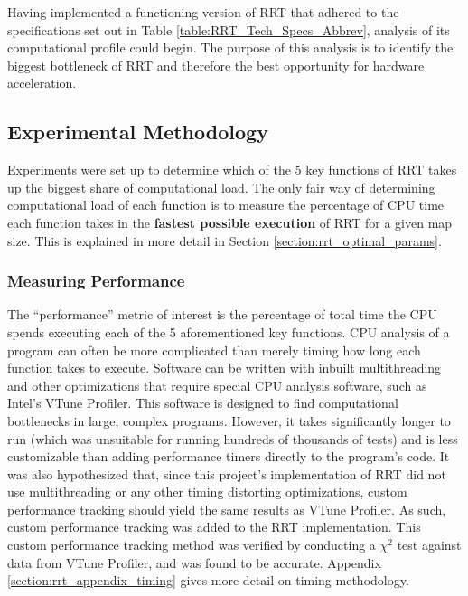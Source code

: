 
Having implemented a functioning version of \gls{RRT} that adhered to the specifications set out in Table \ref{table:RRT_Tech_Specs_Abbrev}, analysis of its computational profile could begin. The purpose of this analysis is to identify the biggest bottleneck of \gls{RRT} and therefore the best opportunity for hardware acceleration.

\subsection{Experimental Methodology}
    Experiments were set up to determine which of the 5 key functions of \gls{RRT} takes up the biggest share of computational load. The only fair way of determining computational load of each function is to measure the percentage of \gls{CPU} time each function takes in the \textbf{fastest possible execution} of \gls{RRT} for a given map size. This is explained in more detail in Section \ref{section:rrt_optimal_params}.

    \subsubsection{Measuring Performance}
        The ``performance'' metric of interest is the percentage of total time the \gls{CPU} spends executing each of the 5 aforementioned key functions. CPU analysis of a program can often be more complicated than merely timing how long each function takes to execute. Software can be written with inbuilt multithreading and other optimizations that require special CPU analysis software, such as Intel's VTune Profiler\cite{Intel2019}. This software is designed to find computational bottlenecks in large, complex programs. However, it takes significantly longer to run (which was unsuitable for running hundreds of thousands of tests) and is less customizable than adding performance timers directly to the program's code. It was also hypothesized that, since this project's implementation of \gls{RRT} did not use multithreading or any other timing distorting optimizations, custom performance tracking should yield the same results as VTune Profiler. As such, custom performance tracking was added to the \gls{RRT} implementation. This custom performance tracking method was verified by conducting a $\chi^2$ test against data from VTune Profiler, and was found to be accurate. Appendix \ref{section:rrt_appendix_timing} gives more detail on timing methodology.

